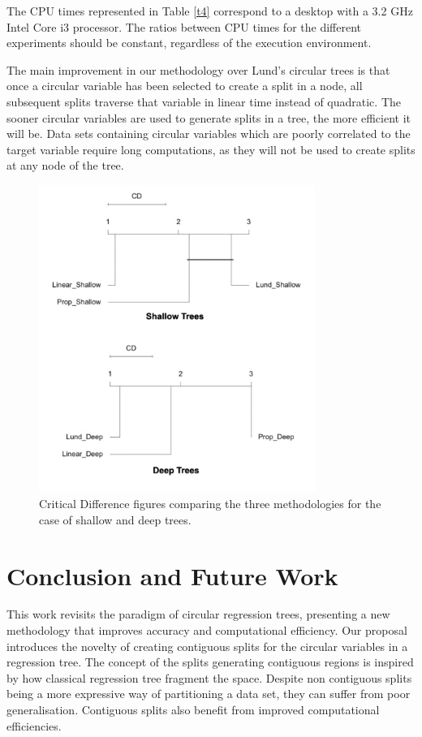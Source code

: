 \documentclass[times,twocolumn,final,authoryear]{elsarticle}
\begin{document}
The CPU times represented in Table \ref{t4} correspond to a desktop with a 3.2 GHz Intel Core i3 processor. The ratios between CPU times for the different experiments should be constant, regardless of the execution environment.

The main improvement in our methodology over Lund's circular trees is that once a circular variable has been selected to create a split in a node, all subsequent splits traverse that variable in linear time instead of quadratic. The sooner circular variables are used to generate splits in a tree, the more efficient it will be. Data sets containing circular variables which are poorly correlated to the target variable require long computations, as they will not be used to create splits at any node of the tree.


\begin{figure}
\centering
\parbox{9cm}{
\includegraphics[width=9cm]{CD.pdf}}
\qquad
\caption{Critical Difference figures comparing the three methodologies for the case of shallow and deep trees.}
\label{f7}
\end{figure}

\section{Conclusion and Future Work}
\label{sec:5}
This work revisits the paradigm of circular regression trees, presenting a new methodology that improves accuracy and computational efficiency. Our proposal introduces the novelty of creating contiguous splits for the circular variables in a regression tree. The concept of the splits generating contiguous regions is inspired by how classical regression tree fragment the space. Despite non contiguous splits being a more expressive way of partitioning a data set, they can suffer from poor generalisation. Contiguous splits also benefit from improved computational efficiencies.
\end{document}
